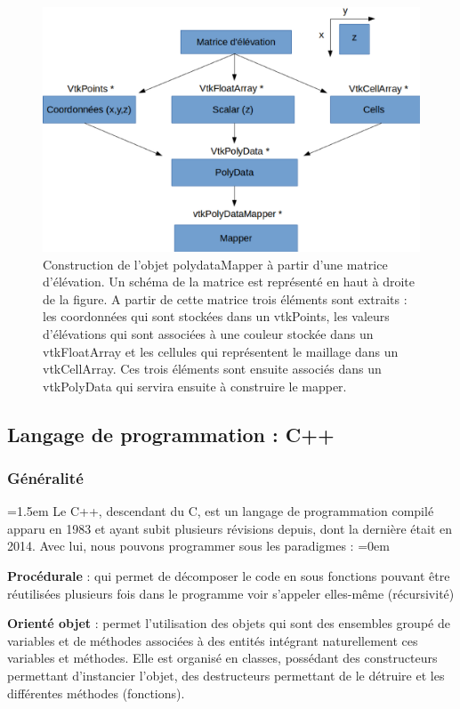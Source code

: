 \documentclass[a4paper,12pt]{article}
\begin{document}
\begin{figure}[h]
	\centering
	\includegraphics[width=15cm]{VTKMeth.eps}  
	\caption{Construction de l'objet polydataMapper à partir d'une matrice d'élévation. Un schéma de la matrice est représenté en haut à droite de la figure. A partir de cette matrice trois éléments sont extraits : les coordonnées qui sont stockées dans un vtkPoints, les valeurs d'élévations qui sont associées à une couleur stockée dans un vtkFloatArray et les cellules qui représentent le maillage dans un vtkCellArray. Ces trois éléments sont ensuite associés dans un vtkPolyData qui servira ensuite à construire le mapper.}
	\label{fig:VTKMeth}
\end{figure} 

	\subsection{Langage de programmation : C++}	
		\subsubsection{Généralité}
\parindent=1.5em
	Le C++, descendant du C, est un langage de programmation compilé apparu en 1983 et ayant subit plusieurs révisions depuis, dont la dernière était en 2014. Avec lui, nous pouvons programmer sous les paradigmes : 
	\parindent=0em
	
\vspace{0.25cm}
\textbf{Procédurale} : qui permet de décomposer le code en sous fonctions pouvant être réutilisées plusieurs fois dans le programme voir s'appeler elles-même (récursivité)

\vspace{0.25cm}
\textbf{Orienté objet} : permet l'utilisation des objets qui sont des ensembles groupé de variables et de méthodes associées à des entités intégrant naturellement ces variables et méthodes. Elle est organisé en classes, possédant des constructeurs permettant d'instancier l'objet, des destructeurs permettant de le détruire et les différentes méthodes (fonctions).
\end{document}
